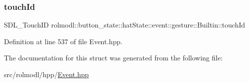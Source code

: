 \subsubsection{\texorpdfstring{touchId}{touchId}}
{\footnotesize\ttfamily S\+D\+L\+\_\+\+Touch\+ID rolmodl\+::button\+\_\+state\+::hat\+State\+::event\+::gesture\+::\+Builtin\+::touch\+Id}



Definition at line 537 of file Event.\+hpp.



The documentation for this struct was generated from the following file\+:\begin{DoxyCompactItemize}
\item 
src/rolmodl/hpp/\mbox{\hyperlink{_event_8hpp}{Event.\+hpp}}\end{DoxyCompactItemize}
